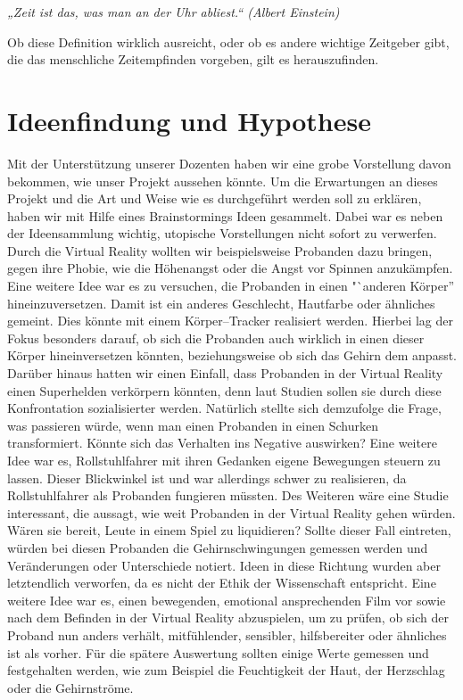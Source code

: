 \documentclass{Bericht}
\begin{document}
	\textit{„Zeit ist das, was man an der Uhr abliest.“ (Albert Einstein)}

	Ob diese Definition wirklich ausreicht, oder ob es andere wichtige Zeitgeber gibt, die das menschliche Zeitempfinden vorgeben, gilt es herauszufinden. 

\section{Ideenfindung und Hypothese} %
	
	Mit der Unterstützung unserer Dozenten haben wir eine grobe Vorstellung davon bekommen, wie unser Projekt aussehen könnte. Um die Erwartungen an dieses Projekt und die Art und Weise wie es durchgeführt werden soll zu erklären, haben wir mit Hilfe eines Brainstormings Ideen gesammelt. Dabei war es neben der Ideensammlung wichtig, utopische Vorstellungen nicht sofort zu verwerfen. Durch die Virtual Reality wollten wir beispielsweise Probanden dazu bringen, gegen ihre Phobie, wie die Höhenangst oder die Angst vor Spinnen anzukämpfen. Eine weitere Idee war es zu versuchen, die Probanden in einen "`anderen Körper'' hineinzuversetzen. Damit ist ein anderes Geschlecht, Hautfarbe oder ähnliches gemeint. Dies könnte mit einem Körper–Tracker realisiert werden. Hierbei lag der Fokus besonders darauf, ob sich die Probanden auch wirklich in einen dieser Körper hineinversetzen könnten, beziehungsweise ob sich das Gehirn dem anpasst. Darüber hinaus hatten wir einen Einfall, dass Probanden in der Virtual Reality einen Superhelden verkörpern könnten, denn laut Studien sollen sie durch diese Konfrontation sozialisierter werden. 
Natürlich stellte sich demzufolge die Frage, was passieren würde, wenn man einen Probanden in einen Schurken transformiert. Könnte sich das Verhalten ins Negative auswirken? Eine weitere Idee war es, Rollstuhlfahrer mit ihren Gedanken eigene Bewegungen steuern zu lassen. Dieser Blickwinkel ist und war allerdings schwer zu realisieren, da Rollstuhlfahrer als Probanden fungieren müssten. Des Weiteren wäre eine Studie interessant, die aussagt, wie weit Probanden in der Virtual Reality gehen würden. Wären sie bereit, Leute in einem Spiel zu liquidieren? Sollte dieser Fall eintreten, würden bei diesen Probanden die Gehirnschwingungen gemessen werden und Veränderungen oder Unterschiede notiert. Ideen in diese Richtung wurden aber letztendlich verworfen, da es nicht der Ethik der Wissenschaft entspricht. Eine weitere Idee war es, einen bewegenden, emotional ansprechenden Film vor sowie nach dem Befinden in der Virtual Reality abzuspielen, um zu prüfen, ob sich der Proband nun anders verhält, mitfühlender, sensibler, hilfsbereiter oder ähnliches ist als vorher. Für die spätere Auswertung sollten einige Werte gemessen und festgehalten werden, wie zum Beispiel die Feuchtigkeit der Haut, der Herzschlag oder die Gehirnströme.
\end{document}
